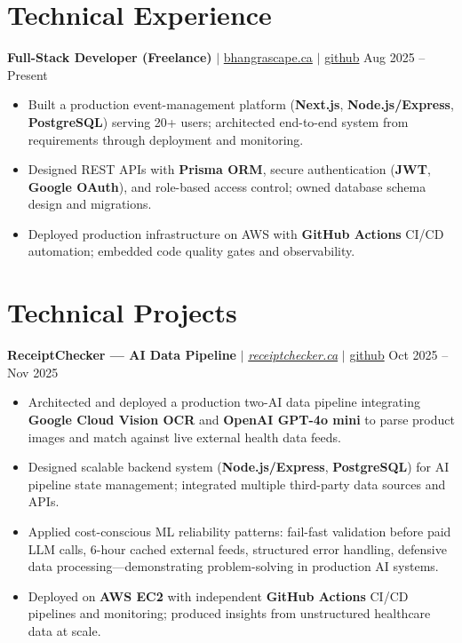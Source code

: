 \documentclass[11pt,a4paper]{article}
\begin{document}
\section{Technical Experience}

\textbf{Full-Stack Developer (Freelance)} $|$ \href{https://bhangrascape.ca}{bhangrascape.ca} $|$ \href{https://github.com/bhat0155/bhangraescape}{\small github} \hfill Aug 2025 -- Present
\begin{itemize}
    \item Built a production event-management platform (\textbf{Next.js}, \textbf{Node.js/Express}, \textbf{PostgreSQL}) serving 20+ users; architected end-to-end system from requirements through deployment and monitoring.
    \item Designed REST APIs with \textbf{Prisma ORM}, secure authentication (\textbf{JWT}, \textbf{Google OAuth}), and role-based access control; owned database schema design and migrations.
    \item Deployed production infrastructure on AWS with \textbf{GitHub Actions} CI/CD automation; embedded code quality gates and observability.
\end{itemize}

\section{Technical Projects}

\textbf{ReceiptChecker — AI Data Pipeline} $|$ \href{https://receiptchecker.ca/}{\emph{receiptchecker.ca}} $|$ \href{https://github.com/bhat0155/receipt-check}{\small github} \hfill Oct 2025 -- Nov 2025
\begin{itemize}
    \item Architected and deployed a production two-AI data pipeline integrating \textbf{Google Cloud Vision OCR} and \textbf{OpenAI GPT-4o mini} to parse product images and match against live external health data feeds.
    \item Designed scalable backend system (\textbf{Node.js/Express}, \textbf{PostgreSQL}) for AI pipeline state management; integrated multiple third-party data sources and APIs.
    \item Applied cost-conscious ML reliability patterns: fail-fast validation before paid LLM calls, 6-hour cached external feeds, structured error handling, defensive data processing—demonstrating problem-solving in production AI systems.
    \item Deployed on \textbf{AWS EC2} with independent \textbf{GitHub Actions} CI/CD pipelines and monitoring; produced insights from unstructured healthcare data at scale.
\end{itemize}
\end{document}
